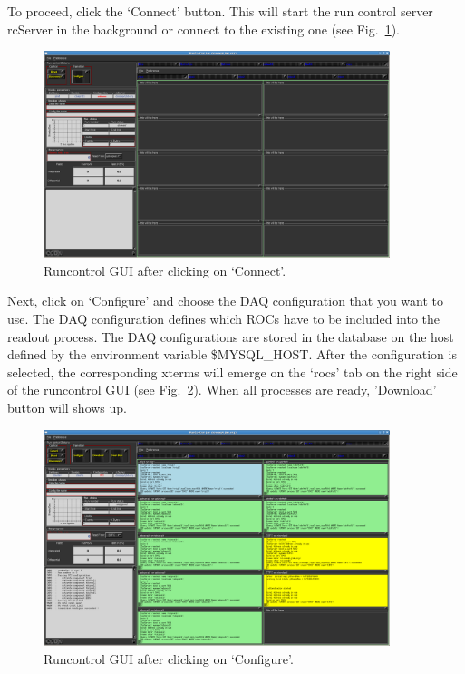 To proceed, click the `Connect' button. This will start the run control server
rcServer in the background or connect to the existing one (see 
Fig.~\ref{fig:runcontrol2}).

\begin{figure}[ht]
\centering
\includegraphics[width=0.9\textwidth]{runcontrol2.png}
\caption{\small{Runcontrol GUI after clicking on `Connect'.}}
\label{fig:runcontrol2} 
\end{figure}

Next, click on `Configure' and choose the DAQ configuration that you want to 
use. The DAQ configuration defines which ROCs have to be included into the
readout process. The DAQ configurations are stored in the database on the 
host defined by the environment variable \$MYSQL\_HOST. After the configuration 
is selected, the corresponding xterms will emerge on the `rocs' tab on the right 
side of the runcontrol GUI (see Fig.~\ref{fig:runcontrol3}). When all
processes are ready, 'Download' button will shows up.

\begin{figure}[ht]
\centering
\includegraphics[width=0.9\textwidth]{runcontrol3.png}
\caption{\small{Runcontrol GUI after clicking on `Configure'.}}
\label{fig:runcontrol3} 
\end{figure}

